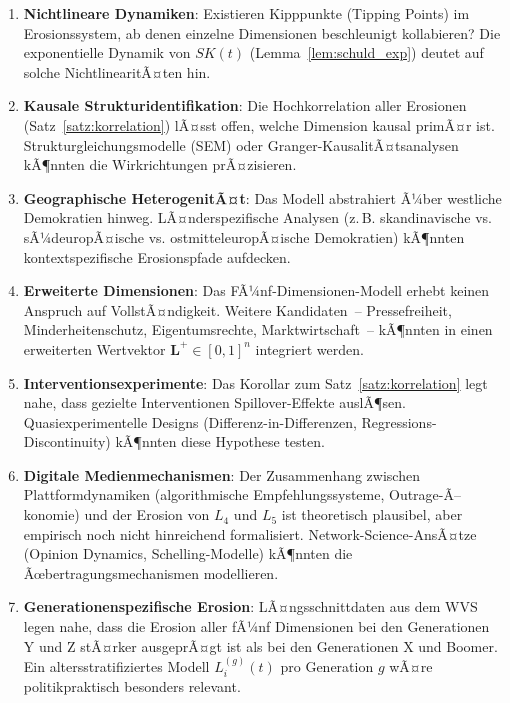 ﻿\documentclass[a4paper,12pt]{article}
\theoremstyle{definition}
\begin{document}
\begin{enumerate}
	\item \textbf{Nichtlineare Dynamiken}: Existieren Kipppunkte (Tipping Points) im Erosionssystem, ab denen einzelne Dimensionen beschleunigt kollabieren? Die exponentielle Dynamik von $SK(t)$ (Lemma~\ref{lem:schuld_exp}) deutet auf solche NichtlinearitÃ¤ten hin.
	
	\item \textbf{Kausale Strukturidentifikation}: Die Hochkorrelation aller Erosionen (Satz~\ref{satz:korrelation}) lÃ¤sst offen, welche Dimension kausal primÃ¤r ist. Strukturgleichungsmodelle (SEM) oder Granger-KausalitÃ¤tsanalysen kÃ¶nnten die Wirkrichtungen prÃ¤zisieren.
	
	\item \textbf{Geographische HeterogenitÃ¤t}: Das Modell abstrahiert Ã¼ber westliche Demokratien hinweg. LÃ¤nderspezifische Analysen (z.\,B. skandinavische vs. sÃ¼deuropÃ¤ische vs. ostmitteleuropÃ¤ische Demokratien) kÃ¶nnten kontextspezifische Erosionspfade aufdecken.
	
	\item \textbf{Erweiterte Dimensionen}: Das FÃ¼nf-Dimensionen-Modell erhebt keinen Anspruch auf VollstÃ¤ndigkeit. Weitere Kandidaten~-- Pressefreiheit, Minderheitenschutz, Eigentumsrechte, Marktwirtschaft~-- kÃ¶nnten in einen erweiterten Wertvektor $\mathbf{L}^+ \in [0,1]^n$ integriert werden.
	
	\item \textbf{Interventionsexperimente}: Das Korollar zum Satz~\ref{satz:korrelation} legt nahe, dass gezielte Interventionen Spillover-Effekte auslÃ¶sen. Quasiexperimentelle Designs (Differenz-in-Differenzen, Regressions-Discontinuity) kÃ¶nnten diese Hypothese testen.
	
	\item \textbf{Digitale Medienmechanismen}: Der Zusammenhang zwischen Plattformdynamiken (algorithmische Empfehlungssysteme, Outrage-Ã–konomie) und der Erosion von $L_4$ und $L_5$ ist theoretisch plausibel, aber empirisch noch nicht hinreichend formalisiert. Network-Science-AnsÃ¤tze (Opinion Dynamics, Schelling-Modelle) kÃ¶nnten die Ãœbertragungsmechanismen modellieren.
	
	\item \textbf{Generationenspezifische Erosion}: LÃ¤ngsschnittdaten aus dem WVS legen nahe, dass die Erosion aller fÃ¼nf Dimensionen bei den Generationen Y und Z stÃ¤rker ausgeprÃ¤gt ist als bei den Generationen X und Boomer. Ein altersstratifiziertes Modell $L_i^{(g)}(t)$ pro Generation $g$ wÃ¤re politikpraktisch besonders relevant.
	

\end{enumerate}
\end{document}
